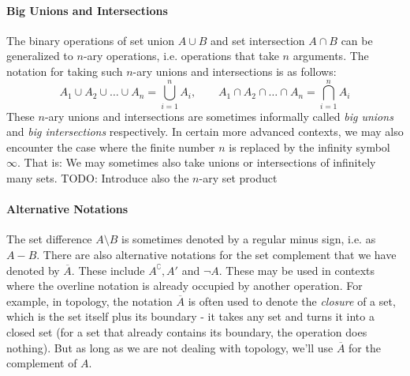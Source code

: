 

\paragraph{Big Unions and Intersections}
The binary operations of set union $A \cup B$ and set intersection $A \cap B$ can be generalized to $n$-ary operations, i.e. operations that take $n$ arguments. The notation for taking such $n$-ary unions and intersections is as follows:
\begin{equation}
A_1 \cup A_2 \cup \ldots \cup A_n = \bigcup_{i=1}^n A_i,  \qquad
A_1 \cap A_2 \cap \ldots \cap A_n = \bigcap_{i=1}^n A_i
\end{equation}
These $n$-ary unions and intersections are sometimes informally called \emph{big unions} and \emph{big intersections} respectively. In certain more advanced contexts, we may also encounter the case where the finite number $n$ is replaced by the infinity symbol $\infty$. That is: We may sometimes also take unions or intersections of infinitely many sets. TODO: Introduce also the $n$-ary set product



\paragraph{Alternative Notations}
The set difference $A \setminus B$ is sometimes denoted by a regular minus sign, i.e. as $A - B$. There are also alternative notations for the set complement that we have denoted by $\overline{A}$. These include $A^\complement, A'$ and $\neg A$. These may be used in contexts where the overline notation is already occupied by another operation. For example, in topology, the notation $\overline{A}$ is often used to denote the \emph{closure} of a set, which is the set itself plus its boundary - it takes any set and turns it into a closed set (for a set that already contains its boundary, the operation does nothing). But as long as we are not dealing with topology, we'll use $\overline{A}$ for the complement of $A$.

